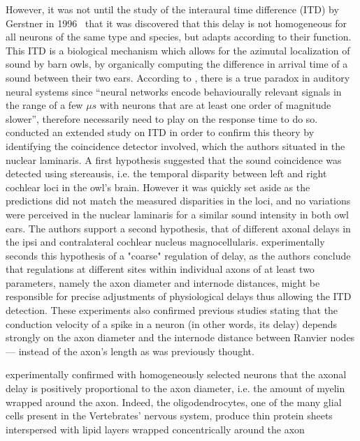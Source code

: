 \documentclass[brainsci, %
               review,submit,pdftex,moreauthors
               ]{Definitions/mdpi}
\begin{document}
However, it was not until the study of the interaural time difference (ITD) by Gerstner in 1996~\citep{gerstner_neuronal_1996} that it was discovered that this delay is not homogeneous for all neurons of the same type and species, but adapts according to their function. This ITD is a biological mechanism which allows for the azimutal localization of sound by barn owls, by organically computing the difference in arrival time of a sound between their two ears. According to \citep{gerstner_neuronal_1996}, there is a true paradox in auditory neural systems since “neural networks encode behaviourally relevant signals in the range of a few $\mu s$ with neurons that are at least one order of magnitude slower”, therefore necessarily need to play on the response time to do so. \citet{pena_2001} conducted an extended study on ITD in order to confirm this theory by identifying the coincidence detector involved, which the authors situated in the nuclear laminaris. A first hypothesis suggested that the sound coincidence was detected using stereausis, i.e. the temporal disparity between left and right cochlear loci in the owl's brain. However it was quickly set aside as the predictions did not match the measured disparities in the loci, and no variations were perceived in the nuclear laminaris for a similar sound intensity in both owl ears. The authors support a second hypothesis, that of different axonal delays in the ipsi and contralateral cochlear nucleus magnocellularis. \citet{seidl_mechanisms_2010} experimentally seconds this hypothesis of a "coarse" regulation of delay, as the authors conclude that regulations at different sites within individual axons of at least two parameters, namely the axon diameter and internode distances, might be responsible for precise adjustments of physiological delays thus allowing the ITD detection. These experiments also confirmed previous studies stating that the conduction velocity of a spike in a neuron (in other words, its delay) depends strongly on the axon diameter \cite{gasser_1939} and the internode distance between Ranvier nodes \cite{brills_1977} --- instead of the axon's length as was previously thought. 


\citet{gasser_1939} experimentally confirmed with homogeneously selected neurons that the axonal delay is positively proportional to the axon diameter, i.e. the amount of myelin wrapped around the axon. Indeed, the oligodendrocytes, one of the many glial cells present in the Vertebrates' nervous system, produce thin protein sheets interspersed with lipid layers wrapped concentrically around the axon~\citep{schmidt_1939}
\end{document}
